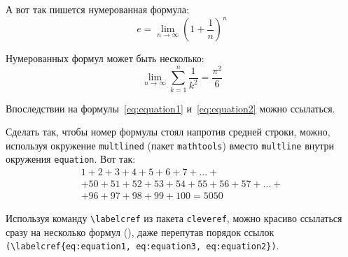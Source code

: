 А вот так пишется нумерованная формула:
\begin{equation}
  \label{eq:equation1}
  e = \lim_{n \to \infty} \left( 1+\frac{1}{n} \right) ^n
\end{equation}

Нумерованных формул может быть несколько:
\begin{equation}
  \label{eq:equation2}
  \lim_{n \to \infty} \sum_{k=1}^n \frac{1}{k^2} = \frac{\pi^2}{6}
\end{equation}

Впоследствии на формулы~\eqref{eq:equation1} и~\eqref{eq:equation2} можно ссылаться.

Сделать так, чтобы номер формулы стоял напротив средней строки, можно,
используя окружение \verb|multlined| (пакет \verb|mathtools|) вместо
\verb|multline| внутри окружения \verb|equation|. Вот так:
\begin{equation} %
  \label{eq:equation3}
    \begin{multlined}
        1+ 2+3+4+5+6+7+\dots + \\
        + 50+51+52+53+54+55+56+57 + \dots + \\
        + 96+97+98+99+100=5050
    \end{multlined}
\end{equation}

Используя команду \verb|\labelcref| из пакета \verb|cleveref|, можно
красиво ссылаться сразу на несколько формул
(), даже перепутав
порядок ссылок \verb|(\labelcref{eq:equation1, eq:equation3, eq:equation2})|.

